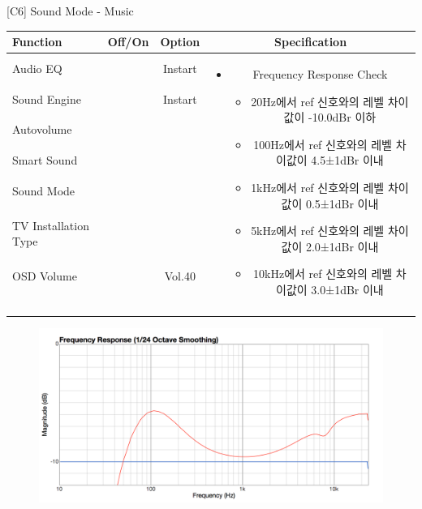 \begin{frame}[t]{[C6] Sound Mode - Music}
\begin{tiny}
\begin{tabular}{@{}lccc@{}}
\toprule
Function & Off/On & Option & Specification \\
\midrule
Audio EQ & \color{black}{Off} & Instart &
\multirow{10}{60mm}{
\begin{itemize}
\item Frequency Response Check
	\begin{itemize}
	\item 20Hz에서 ref 신호와의 레벨 차이값이 -10.0dBr 이하
	\item 100Hz에서 ref 신호와의 레벨 차이값이 4.5±1dBr 이내
	\item 1kHz에서 ref 신호와의 레벨 차이값이 0.5±1dBr 이내
	\item 5kHz에서 ref 신호와의 레벨 차이값이 2.0±1dBr 이내
	\item 10kHz에서 ref 신호와의 레벨 차이값이 3.0±1dBr 이내
	\end{itemize}
\end{itemize}
} \\
Sound Engine & \color{blue}{On} & Instart & \\
Autovolume & \color{black}{Off} & & \\
Smart Sound & \color{black}{Off} & & \\
Sound Mode & \color{blue}{On} & \color{blue}{Music} & \\
TV Installation Type & \color{blue}{On} & \color{black}{Standtype1} & \\
OSD Volume & \color{blue}{On} & Vol.40 & \\
& & & \\
& & & \\
& & & \\
& & & \\
\midrule
\end{tabular}
\end{tiny}

\begin{figure}[b]
\includegraphics[height=0.3\textwidth]{figures/music.png}
\end{figure}

\end{frame}
